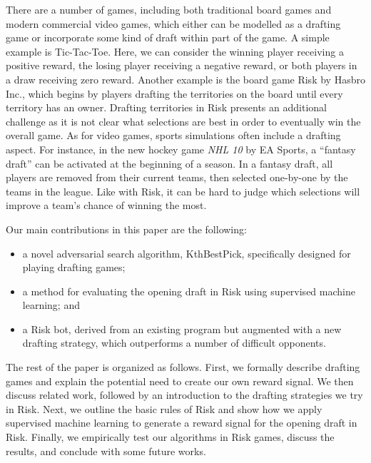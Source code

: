 \documentclass[letterpaper]{article}
\numberwithin{equation}{section}
\numberwithin{theorem}{section}
\numberwithin{lemma}{section}
\numberwithin{df}{section}
\begin{document}
There are a number of games, including both traditional board games and modern commercial video games, which either can be modelled as a drafting game or incorporate some kind of draft within part of the game.  A simple example is Tic-Tac-Toe. Here, we can consider the winning player receiving a positive reward, the losing player receiving a negative reward, or both players in a draw receiving zero reward. Another example is the board game Risk by Hasbro Inc., which begins by players drafting the territories on the board until every territory has an owner.  Drafting territories in Risk presents an additional challenge as it is not clear what selections are best in order to eventually win the overall game.  As for video games, sports simulations often include a drafting aspect.  For instance, %
in the new hockey game \textit{NHL 10} by EA Sports, a ``fantasy draft'' can be activated at the beginning of a season.  In a fantasy draft, all players are removed from their current teams, then selected one-by-one by the teams in the league.  Like with Risk, it can be hard to judge which selections will improve a team's chance of winning the most.  %

Our main contributions in this paper are the following:
\begin{itemize} %
	\item a novel adversarial search algorithm, KthBestPick, specifically designed for playing drafting games;
	\item a method for evaluating the opening draft in Risk using supervised machine learning; and
	\item a Risk bot, derived from an existing program but augmented with a new drafting strategy, which outperforms a number of difficult opponents.
\end{itemize}
The rest of the paper is organized as follows.  First, we formally describe drafting games and explain the potential need to create our own reward signal.  We then discuss related work, followed by an introduction to the drafting strategies we try in Risk.  Next, we outline the basic rules of Risk and show how we apply supervised machine learning to generate a reward signal for the opening draft in Risk.  Finally, we empirically test our algorithms in Risk games, discuss the results, and conclude with some future works.
\end{document}
